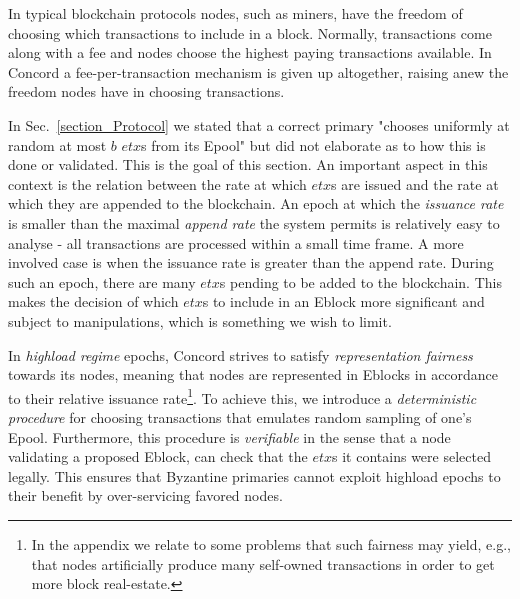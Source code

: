 
In typical blockchain protocols nodes, such as miners, have the freedom of choosing which transactions to include in a block. Normally, transactions come along with a fee and nodes choose the highest paying transactions available. 
In Concord a fee-per-transaction mechanism is given up altogether, 
raising anew the freedom nodes have in choosing transactions.

In Sec.~\ref{section_Protocol} we stated that a correct primary "chooses uniformly at random at most $b$ $etx$s from its Epool" but did not elaborate as to how this is done or validated. This is the goal of this section. An important aspect in this context is the relation between the rate at which $etx$s are issued and the rate at which they are appended to the blockchain. An epoch at which the \emph{issuance rate} is smaller than the maximal \emph{append rate} the system permits is relatively easy to analyse - all transactions are processed within a small time frame. A more involved case is when the issuance rate is greater than the append rate. During such an epoch, there are many $etx$s pending to be added to the blockchain. This makes the decision of which $etx$s to include in an Eblock more significant and subject to manipulations, which is something we wish to limit.

In \emph{highload regime} epochs, Concord strives to satisfy \emph{representation fairness} towards its nodes, meaning that nodes are represented in Eblocks in accordance to their relative issuance rate\footnote{In the appendix we relate to some problems that such fairness may yield, e.g., that nodes artificially produce many self-owned transactions in order to get more block real-estate.}. To achieve this, we introduce a \emph{deterministic procedure} for choosing transactions that emulates random sampling of one's Epool. Furthermore, this procedure is \emph{verifiable} in the sense that a node validating a proposed Eblock, can check that the $etx$s it contains were selected legally. This ensures that Byzantine primaries cannot exploit highload epochs to their benefit by over-servicing favored nodes.

